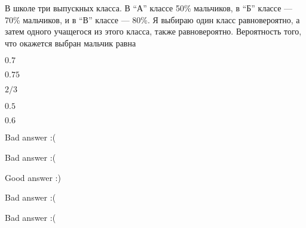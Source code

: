 
\begin{question}
В школе три выпускных класса. В ``А'' классе 50\% мальчиков, в ``Б''
классе --- 70\% мальчиков, и в ``В'' классе --- 80\%. Я выбираю один
класс равновероятно, а затем одного учащегося из этого класса, также
равновероятно. Вероятность того, что окажется выбран мальчик равна
\begin{answerlist}
  \item \(0.7\)
  \item \(0.75\)
  \item \(2/3\)
  \item \(0.5\)
  \item \(0.6\)
\end{answerlist}
\end{question}

\begin{solution}
\begin{answerlist}
  \item Bad answer :(
  \item Bad answer :(
  \item Good answer :)
  \item Bad answer :(
  \item Bad answer :(
\end{answerlist}
\end{solution}

